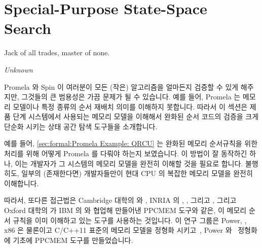 
\section{Special-Purpose State-Space Search}
\label{sec:formal:Special-Purpose State-Space Search}
%
\epigraph{Jack of all trades, master of none.}{\emph{Unknown}}

Promela 와 Spin 이 여러분이 모든 (작은) 알고리즘을 얼마든지 검증할 수 있게
해주지만, 그것들의 큰 범용성은 가끔 문제가 될 수 있습니다.
예를 들어, Promela 는 메모리 모델이나 특정 종류의 순서 재배치 의미를 이해하지
못합니다.
따라서 이 섹션은 제품 단계 시스템에서 사용되는 메모리 모델을 이해해서 완화된
순서 코드의 검증을 크게 단순화 시키는 상태 공간 탐색 도구들을 소개합니다.

예를 들어,
\cref{sec:formal:Promela Example: QRCU}
는 완화된 메모리 순서규칙을 위한 처리를 위해 어떻게 Promela 를 다뤄야 하는지
보였습니다.
이 방법이 잘 동작하긴 하나, 이는 개발자가 그 시스템의 메모리 모델을 완전히
이해할 것을 필요로 합니다.
불행히도, 일부의 (존재한다면) 개발자들만이 현대 CPU 의 복잡한 메모리 모델을
완전히 이해합니다.

\iffalse

Although Promela and Spin allow you to verify pretty much any (smallish)
algorithm, their very generality can sometimes be a curse.
For example, Promela does not understand memory models or any sort
of reordering semantics.
This section therefore describes some state-space search tools that
understand memory models used by production systems, greatly simplifying the
verification of weakly ordered code.

For example,
\cref{sec:formal:Promela Example: QRCU}
showed how to convince Promela to account for weak memory ordering.
Although this approach can work well, it requires that the developer
fully understand the system's memory model.
Unfortunately, few (if any) developers fully understand the complex
memory models of modern CPUs.

\fi

따라서, 또다른 접근법은 Cambridge 대학의  와
, INRIA 의 ,
, 그리고  , 그리고 Oxford
대학의  가 IBM 의  와 협업해 만들어낸
PPCMEM 도구와 같은, 이 메모리 순서 규칙을 이미 이해하고 있는 도구를 사용하는
것입니다.
이 연구 그룹은 Power, \ARM, x86 은 물론이고 C/C++11 표준의 메모리 모델을 정형화
시키고~\cite{RichardSmith2019N4800}, Power 와 \ARM\ 정형화에 기초에 PPCMEM
도구를 만들었습니다.


